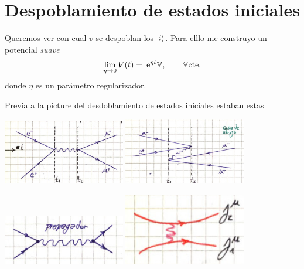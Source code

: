 \documentclass[10pt,oneside]{CBFT_book}
\begin{document}
\section{Despoblamiento de estados iniciales}

Queremos ver con cual $v$ se despoblan los $\Ket{i}$. Para elllo me construyo un potencial {\it suave}
\[
	\lim_{\eta\to 0} V(t) = \:\mathrm{e}^{\eta t} \mathbb{V}, \qquad  \mathbb{V} \text{cte.}
\]
donde $\eta$ es un parámetro regularizador.

Previa a la picture del desdoblamiento de estados iniciales estaban estas

\includegraphics[width=0.4\textwidth]{images/fig_ft2_desdoblamiento_1a.jpg}
\includegraphics[width=0.4\textwidth]{images/fig_ft2_desdoblamiento_1b.jpg}

\includegraphics[width=0.4\textwidth]{images/fig_ft2_desdoblamiento_2a.jpg}
\includegraphics[width=0.4\textwidth]{images/fig_ft2_desdoblamiento_2b.jpg}
\end{document}
